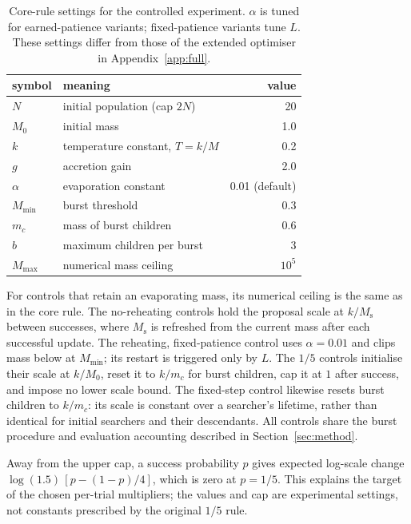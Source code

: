 \documentclass[10pt,a4paper]{article}
\newcommand{\Mmin}{M_{\min}}
\begin{document}
\begin{table}[htbp]
\centering
\small
\caption{Core-rule settings for the controlled experiment. $\alpha$ is tuned for
earned-patience variants; fixed-patience variants tune $L$. These settings differ
from those of the extended optimiser in Appendix~\ref{app:full}.}
\label{tab:params}
\begin{tabular}{@{}llr@{}}
\toprule
symbol & meaning & value \\
\midrule
$N$       & initial population (cap $2N$)          & 20 \\
$M_0$     & initial mass                           & 1.0 \\
$k$       & temperature constant, $T = k/M$         & 0.2 \\
$g$       & accretion gain                         & 2.0 \\
$\alpha$  & evaporation constant                   & 0.01 (default) \\
$\Mmin$   & burst threshold                        & 0.3 \\
$m_c$     & mass of burst children                 & 0.6 \\
$b$       & maximum children per burst             & 3 \\
$M_{\max}$ & numerical mass ceiling                & $10^5$ \\
\bottomrule
\end{tabular}
\end{table}

For controls that retain an evaporating mass, its numerical ceiling is the
same as in the core rule. The no-reheating controls hold the proposal scale at
$k/M_{\mathrm s}$ between successes, where $M_{\mathrm s}$ is refreshed from the
current mass after each successful update. The reheating, fixed-patience
control uses $\alpha=0.01$ and clips mass below at $\Mmin$; its restart is
triggered only by $L$. The $1/5$ controls initialise their scale at $k/M_0$,
reset it to $k/m_c$ for burst children, cap it at $1$ after success, and impose
no lower scale bound. The fixed-step control likewise resets burst children
to $k/m_c$: its scale is constant over a searcher's lifetime, rather than
identical for initial searchers and their descendants. All controls share the
burst procedure and evaluation accounting described in Section~\ref{sec:method}.

Away from the upper cap, a success probability $p$ gives expected log-scale
change $\log(1.5)\,[p-(1-p)/4]$, which is zero at $p=1/5$. This explains the
target of the chosen per-trial multipliers; the values and cap are experimental
settings, not constants prescribed by the original $1/5$ rule.
\end{document}
